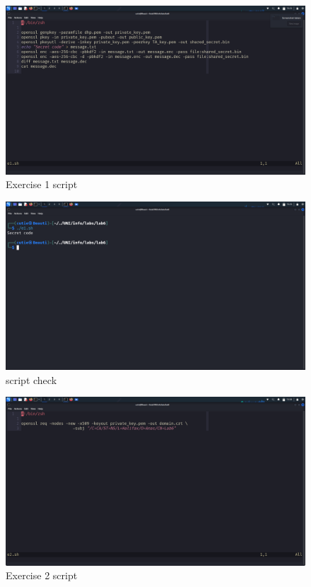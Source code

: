 \documentclass{article}
\numberwithin{equation}{subsection}
\begin{document}
	\begin{center}
	
		\begin{figure}[H]
		\includegraphics[width=400pt]{pic/e1_script.png}
		\caption{Exercise 1 script}
	\end{figure}

	\begin{figure}[H]
		\includegraphics[width=400pt]{pic/e2_script.png}
		\caption{script check}
	\end{figure}

	\begin{figure}[H]
		\includegraphics[width=400pt]{pic/Screenshot_2025-03-14_15_58_43.png}
		\caption{Exercise 2 script}
	\end{figure}

\end{center}
\end{document}
